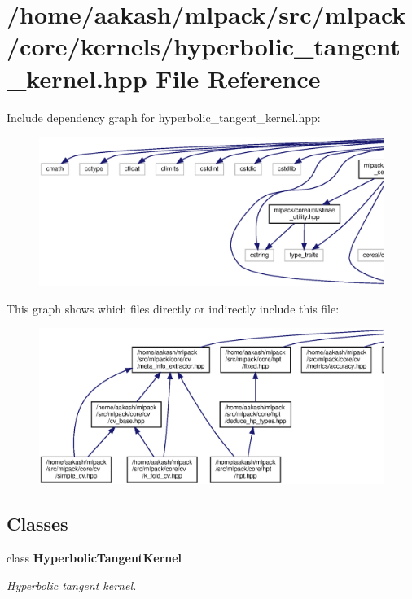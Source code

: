\section{/home/aakash/mlpack/src/mlpack/core/kernels/hyperbolic\+\_\+tangent\+\_\+kernel.hpp File Reference}
\label{hyperbolic__tangent__kernel_8hpp}
Include dependency graph for hyperbolic\+\_\+tangent\+\_\+kernel.\+hpp\+:
\nopagebreak
\begin{figure}[H]
\begin{center}
\leavevmode
\includegraphics[width=350pt]{hyperbolic__tangent__kernel_8hpp__incl}
\end{center}
\end{figure}
This graph shows which files directly or indirectly include this file\+:
\nopagebreak
\begin{figure}[H]
\begin{center}
\leavevmode
\includegraphics[width=350pt]{hyperbolic__tangent__kernel_8hpp__dep__incl}
\end{center}
\end{figure}
\subsection*{Classes}
\begin{DoxyCompactItemize}
\item 
class \textbf{ Hyperbolic\+Tangent\+Kernel}
\begin{DoxyCompactList}\small\item\em Hyperbolic tangent kernel. \end{DoxyCompactList}\end{DoxyCompactItemize}
